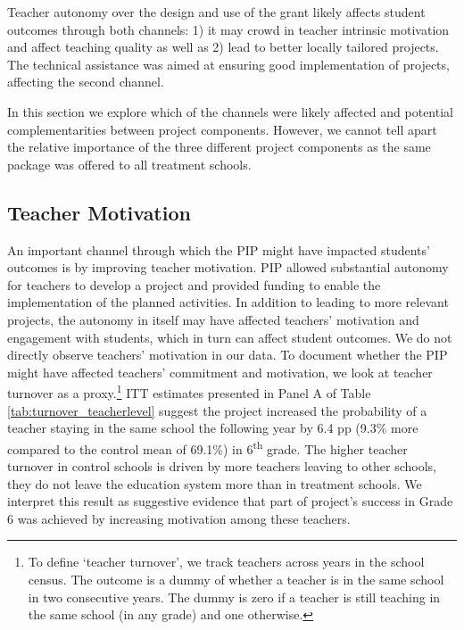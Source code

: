 \documentclass[11pt,a4paper]{article}
\begin{document}
Teacher autonomy over the design and use of the grant likely affects student outcomes through both channels: 1) it may crowd in teacher intrinsic motivation and affect teaching quality as well as 2) lead to better locally tailored projects. The technical assistance was aimed at ensuring good implementation of projects, affecting the second channel. 

In this section we explore which of the channels were likely affected and potential complementarities between project components. However, we cannot tell apart the relative importance of the three different project components as the same package was offered to all treatment schools. 

\subsection{Teacher Motivation} \label{sec:turnover}

An important channel through which the PIP might have impacted students' outcomes is by improving teacher motivation. PIP allowed substantial autonomy for teachers to develop a project and provided funding to enable the implementation of the planned activities. In addition to leading to more relevant projects, the autonomy in itself may have affected teachers' motivation and engagement with students, which in turn can affect student outcomes. We do not directly observe teachers' motivation in our data. To document whether the PIP might have affected teachers' commitment and motivation, we look at teacher turnover as a proxy.\footnote{To define `teacher turnover', we track teachers across years in the school census. The outcome is a dummy of whether a teacher is in the same school in two consecutive years. The dummy is zero if a teacher is still teaching in the same school (in any grade) and one otherwise.} ITT estimates presented in Panel A of Table \ref{tab:turnover_teacherlevel} suggest the project increased the probability of a teacher staying in the same school the following year by 6.4 pp (9.3\% more compared to the control mean of 69.1\%) in 6\textsuperscript{th} grade. The higher teacher turnover in control schools is driven by more teachers leaving to other schools, they do not leave the education system more than in treatment schools. We interpret this result as suggestive evidence that part of project's success in Grade 6 was achieved by increasing motivation among these teachers. 
\end{document}
